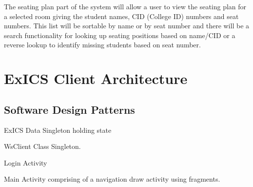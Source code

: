 The seating plan part of the system will allow a user to view the seating plan for a selected room giving the student names, CID (College ID) numbers and seat numbers.  This list will be sortable by name or by seat number and there will be a search functionality for looking up seating positions based on name/CID or a reverse lookup to identify missing students based on seat number.

\section{ExICS Client Architecture}

\subsection{Software Design Patterns}

ExICS Data Singleton holding state

WsClient Class Singleton.

Login Activity

Main Activity comprising of a navigation draw\cite{navdrawer} activity using fragments\cite{fragments}.